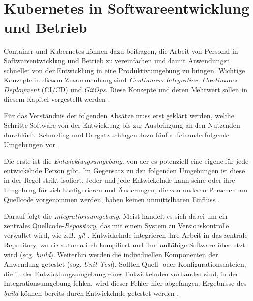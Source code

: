 \documentclass[11pt,a4paper]{article}
\begin{document}


\section{Kubernetes in Softwareentwicklung und Betrieb}
Container und Kubernetes können dazu beitragen, die Arbeit von Personal in Softwareentwicklung und
Betrieb zu vereinfachen und damit Anwendungen schneller von der Entwicklung
in eine Produktivumgebung zu bringen.
Wichtige Konzepte in diesem Zusammenhang sind
\emph{Continuous Integration}, \emph{Continuous Deployment} (CI/CD)
und \emph{GitOps}. Diese Konzepte und deren Mehrwert sollen in diesem Kapitel vorgestellt werden \cite{domingus2022cloud}.

Für das Verständnis der folgenden Absätze muss erst geklärt werden,
welche Schritte Software von der Entwicklung bis zur Ausbringung an den
Nutzenden durchläuft.
Schmeling und Dargatz \cite{Schmeling_Dargatz_2022} schlagen dazu
fünf aufeinanderfolgende Umgebungen vor.

Die erste ist die \emph{Entwicklungsumgebung}, von der es potenziell
eine eigene für jede entwickelnde Person gibt. Im Gegensatz zu den folgenden
Umgebungen ist diese in der Regel strikt isoliert. Jeder und jede Entwickelnde
kann seine oder ihre Umgebung für sich konfigurieren und Änderungen, die von anderen
Personen am Quellcode vorgenommen werden, haben keinen unmittelbaren Einfluss \cite{Schmeling_Dargatz_2022}.

Darauf folgt die \emph{Integrationsumgebung}. Meist handelt es sich dabei
um ein zentrales Quellcode-\emph{Repository}, das mit einem System zu Versionskontrolle
verwaltet wird, wie z.B. \emph{git} \cite{chacon2014pro}.
Entwickelnde integrieren ihre Arbeit in das zentrale Repository, wo sie
automatisch kompiliert und ihn lauffähige Software übersetzt wird (sog. \emph{build}).
Weiterhin werden die individuellen Komponenten der Anwendung getestet (sog. \emph{Unit-Test}).
Sollten Quell- oder Konfigurationsdateien, die in der Entwicklungsumgebung
eines Entwickelnden vorhanden sind, in der Integrationsumgebung fehlen,
wird dieser Fehler hier abgefangen.
Ergebnisse des \emph{build} können bereits durch Entwickelnde getestet werden \cite{Schmeling_Dargatz_2022}.
\end{document}
